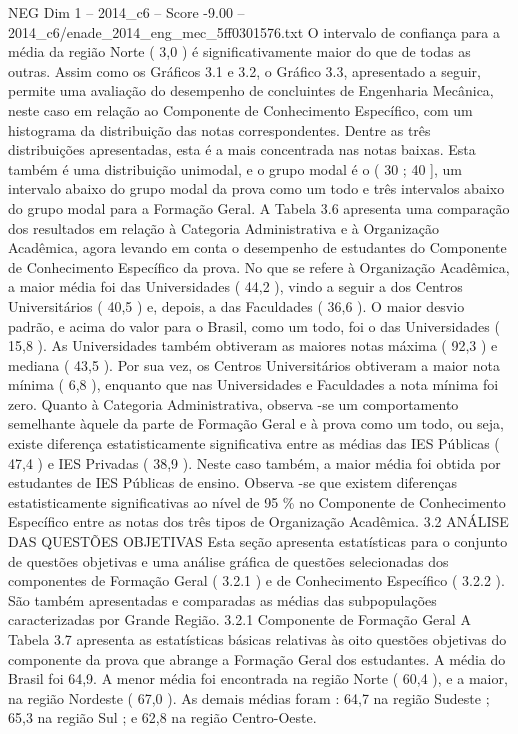 \begin{textsample}{NEG Dim 1 – 2014\_c6 – Score -9.00 – 2014\_c6/enade\_2014\_eng\_mec\_5ff0301576.txt}
O intervalo de confiança para a média da região Norte ( 3,0 ) é significativamente maior do que de todas as outras.
Assim como os Gráficos 3.1 e 3.2, o Gráfico 3.3, apresentado a seguir, permite uma avaliação do desempenho de concluintes de Engenharia Mecânica, neste caso em relação ao Componente de Conhecimento Específico, com um histograma da distribuição das notas correspondentes.
Dentre as três distribuições apresentadas, esta é a mais concentrada nas notas baixas.
Esta também é uma distribuição unimodal, e o grupo modal é o ( 30 ; 40 ], um intervalo abaixo do grupo modal da prova como um todo e três intervalos abaixo do grupo modal para a Formação Geral.
A Tabela 3.6 apresenta uma comparação dos resultados em relação à Categoria Administrativa e à Organização Acadêmica, agora levando em conta o desempenho de estudantes do Componente de Conhecimento Específico da prova.
No que se refere à Organização Acadêmica, a maior média foi das Universidades ( 44,2 ), vindo a seguir a dos Centros Universitários ( 40,5 ) e, depois, a das Faculdades ( 36,6 ).
O maior desvio padrão, e acima do valor para o Brasil, como um todo, foi o das Universidades ( 15,8 ).
As Universidades também obtiveram as maiores notas máxima ( 92,3 ) e mediana ( 43,5 ).
Por sua vez, os Centros Universitários obtiveram a maior nota mínima ( 6,8 ), enquanto que nas Universidades e Faculdades a nota mínima foi zero.
Quanto à Categoria Administrativa, observa -se um comportamento semelhante àquele da parte de Formação Geral e à prova como um todo, ou seja, existe diferença estatisticamente significativa entre as médias das IES Públicas ( 47,4 ) e IES Privadas ( 38,9 ).
Neste caso também, a maior média foi obtida por estudantes de IES Públicas de ensino.
Observa -se que existem diferenças estatisticamente significativas ao nível de 95 \% no Componente de Conhecimento Específico entre as notas dos três tipos de Organização Acadêmica. 3.2 ANÁLISE DAS QUESTÕES OBJETIVAS Esta seção apresenta estatísticas para o conjunto de questões objetivas e uma análise gráfica de questões selecionadas dos componentes de Formação Geral ( 3.2.1 ) e de Conhecimento Específico ( 3.2.2 ).
São também apresentadas e comparadas as médias das subpopulações caracterizadas por Grande Região. 3.2.1 Componente de Formação Geral A Tabela 3.7 apresenta as estatísticas básicas relativas às oito questões objetivas do componente da prova que abrange a Formação Geral dos estudantes.
A média do Brasil foi 64,9.
A menor média foi encontrada na região Norte ( 60,4 ), e a maior, na região Nordeste ( 67,0 ).
As demais médias foram : 64,7 na região Sudeste ; 65,3 na região Sul ; e 62,8 na região Centro-Oeste.

\end{textsample}
